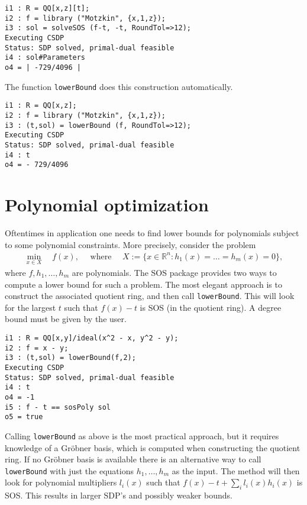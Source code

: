 \documentclass[11pt]{amsart}
\theoremstyle{plain}%
\theoremstyle{definition}
\theoremstyle{remark}
\newcommand{\SOS}{\textsc{SOS}\xspace}
\newcommand{\RR}{\mathbb{R}}
\begin{document}
{\small
\begin{verbatim}
i1 : R = QQ[x,z][t];
i2 : f = library ("Motzkin", {x,1,z});
i3 : sol = solveSOS (f-t, -t, RoundTol=>12);
Executing CSDP
Status: SDP solved, primal-dual feasible
i4 : sol#Parameters
o4 = | -729/4096 |
\end{verbatim}
}

\noindent
The function \verb|lowerBound| does this construction automatically.
{\small
\begin{verbatim}
i1 : R = QQ[x,z];
i2 : f = library ("Motzkin", {x,1,z});
i3 : (t,sol) = lowerBound (f, RoundTol=>12);
Executing CSDP
Status: SDP solved, primal-dual feasible
i4 : t
o4 = - 729/4096
\end{verbatim}
}

\section{Polynomial optimization}

Oftentimes in application one needs to find lower bounds for polynomials subject to some polynomial constraints.
More precisely, consider the problem
\begin{align*}
  \min_{x\in X} \quad f(x),
  \quad \text{ where }\quad
  X := \{x \in \RR^n : h_1(x)=\dots=h_m(x)=0\},
\end{align*}
where $f, h_1,\dots,h_m$ are polynomials.
The \SOS package provides two ways to compute a lower bound for such a problem.
The most elegant approach is to construct the associated quotient ring, and then call \verb|lowerBound|.
This will look for the largest $t$ such that $f(x)-t$ is SOS (in the quotient ring).
A degree bound must be given by the user.

{\small
\begin{verbatim}
i1 : R = QQ[x,y]/ideal(x^2 - x, y^2 - y);
i2 : f = x - y;
i3 : (t,sol) = lowerBound(f,2);
Executing CSDP
Status: SDP solved, primal-dual feasible
i4 : t
o4 = -1
i5 : f - t == sosPoly sol
o5 = true
\end{verbatim}
}

Calling \verb|lowerBound| as above is the most practical approach, but it requires knowledge of a Gröbner basis, which is computed when constructing the quotient ring.
If no Gröbner basis is available there is an alternative way to call \verb|lowerBound| with just the equations $h_1,\dots,h_m$ as the input.
The method will then look for polynomial multipliers $l_i(x)$ such that $f(x) - t + \sum_i l_i(x)h_i(x)$ is SOS.
This results in larger SDP's and possibly weaker bounds.
\end{document}
